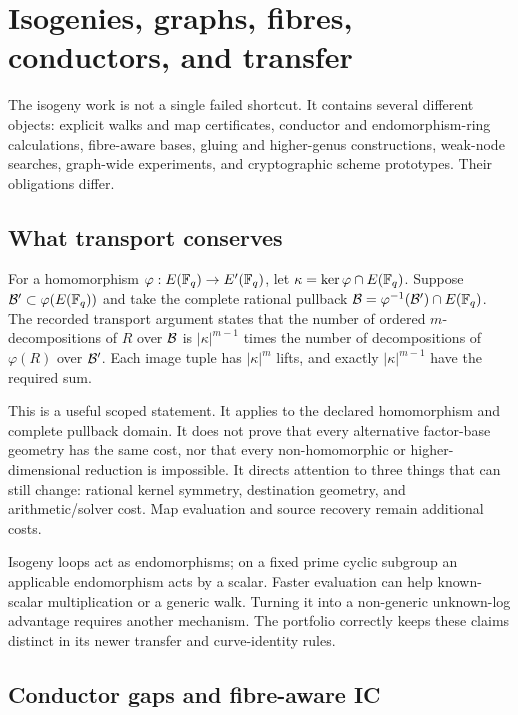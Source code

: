 \section{Isogenies, graphs, fibres, conductors, and transfer}\label{sec:isogenies}

The isogeny work is not a single failed shortcut. It contains several
different objects: explicit walks and map certificates, conductor and
endomorphism-ring calculations, fibre-aware bases, gluing and
higher-genus constructions, weak-node searches, graph-wide experiments,
and cryptographic scheme prototypes. Their obligations differ.

\subsection{What transport conserves}

For a homomorphism $\varphi:E(\mathbb F_q)\to E'(\mathbb F_q)$, let
$\kappa=\ker\varphi\cap E(\mathbb F_q)$. Suppose
$\mathcal B'\subset\varphi(E(\mathbb F_q))$ and take the complete rational pullback
$\mathcal B=\varphi^{-1}(\mathcal B')\cap E(\mathbb F_q)$. The recorded transport argument
states that the number of ordered $m$-decompositions of $R$ over $\mathcal B$
is $|\kappa|^{m-1}$ times the number of decompositions of $\varphi(R)$
over $\mathcal B'$. Each image tuple has $|\kappa|^m$ lifts, and exactly
$|\kappa|^{m-1}$ have the required sum.

This is a useful scoped statement. It applies to the declared
homomorphism and complete pullback domain. It does not prove that every
alternative factor-base geometry has the same cost, nor that every
non-homomorphic or higher-dimensional reduction is impossible. It
directs attention to three things that can still change: rational
kernel symmetry, destination geometry, and arithmetic/solver cost.
Map evaluation and source recovery remain additional costs.

Isogeny loops act as endomorphisms; on a fixed prime cyclic subgroup an
applicable endomorphism acts by a scalar. Faster evaluation can help
known-scalar multiplication or a generic walk. Turning it into a
non-generic unknown-log advantage requires another mechanism. The
portfolio correctly keeps these claims distinct in its newer transfer
and curve-identity rules.

\subsection{Conductor gaps and fibre-aware IC}

